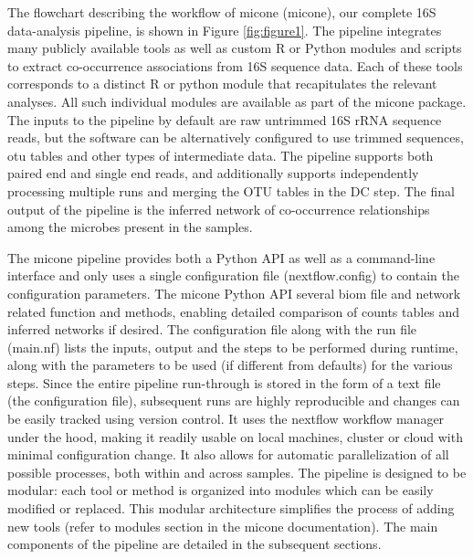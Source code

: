   \vspace{-5mm}
  The flowchart describing the workflow of \ac{micone} (\acl{micone}), our complete 16S data-analysis pipeline, is shown in Figure \ref{fig:figure1}.
  The pipeline integrates many publicly available tools as well as custom R or Python modules and scripts to extract co-occurrence associations from 16S sequence data.
  Each of these tools corresponds to a distinct R or python module that recapitulates the relevant analyses.
  All such individual modules are available as part of the \ac{micone} package.
  The inputs to the pipeline by default are raw untrimmed 16S rRNA sequence reads, but the software can be alternatively configured to use trimmed sequences, \ac{otu} tables and other types of intermediate data.
  The pipeline supports both paired end and single end reads, and additionally supports independently processing multiple runs and merging the OTU tables in the DC step.
  The final output of the pipeline is the inferred network of co-occurrence relationships among the microbes present in the samples.

  The \ac{micone} pipeline provides both a Python API as well as a command-line interface and only uses a single configuration file (nextflow.config) to contain the configuration parameters.
  The \ac{micone} Python API several biom file and network related function and methods, enabling detailed comparison of counts tables and inferred networks if desired.
  The configuration file along with the run file (main.nf) lists the inputs, output and the steps to be performed during runtime, along with the parameters to be used (if different from defaults) for the various steps.
  Since the entire pipeline run-through is stored in the form of a text file (the configuration file), subsequent runs are highly reproducible and changes can be easily tracked using version control.
  It uses the nextflow workflow manager~\cite{Tommaso2015} under the hood, making it readily usable on local machines, cluster or cloud with minimal configuration change.
  It also allows for automatic parallelization of all possible processes, both within and across samples.
  The pipeline is designed to be modular: each tool or method is organized into modules which can be easily modified or replaced.
  This modular architecture simplifies the process of adding new tools (refer to modules section in the \ac{micone} documentation).
  The main components of the pipeline are detailed in the subsequent sections.

